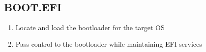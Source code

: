\subsection{BOOT.EFI}

\begin{enumerate}
	\item Locate and load the bootloader for the target OS
	\item Pass control to the bootloader while maintaining EFI services
\end{enumerate}

